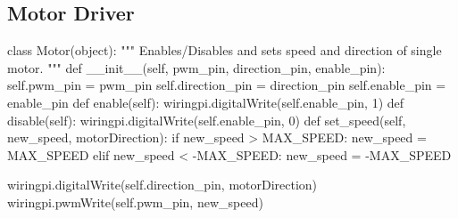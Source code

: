 \documentclass[onecolumn, draftclsnofoot,10pt, compsoc]{IEEEtran}
\begin{document}
\subsection{Motor Driver}
\begin{python}
class Motor(object):
    """
    Enables/Disables and sets speed and direction of single motor.
    """
    def __init__(self, pwm_pin, direction_pin, enable_pin):
        self.pwm_pin = pwm_pin
        self.direction_pin = direction_pin
        self.enable_pin = enable_pin
    def enable(self):
        wiringpi.digitalWrite(self.enable_pin, 1)
    def disable(self):
        wiringpi.digitalWrite(self.enable_pin, 0)
    def set_speed(self, new_speed, motorDirection):
        if new_speed > MAX_SPEED:
            new_speed = MAX_SPEED
        elif new_speed < -MAX_SPEED:
            new_speed = -MAX_SPEED

        wiringpi.digitalWrite(self.direction_pin, motorDirection)
        wiringpi.pwmWrite(self.pwm_pin, new_speed)
\end{python}
\end{document}
